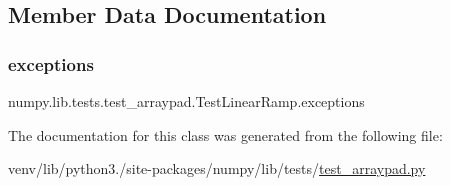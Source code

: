 \subsection{Member Data Documentation}
\mbox{\label{classnumpy_1_1lib_1_1tests_1_1test__arraypad_1_1TestLinearRamp_a6051ce71678e5f8a9587ab6c139c1cf2}} 
\subsubsection{\texorpdfstring{exceptions}{exceptions}}
{\footnotesize\ttfamily numpy.\+lib.\+tests.\+test\+\_\+arraypad.\+Test\+Linear\+Ramp.\+exceptions\hspace{0.3cm}{\ttfamily [static]}}



The documentation for this class was generated from the following file\+:\begin{DoxyCompactItemize}
\item 
venv/lib/python3./site-\/packages/numpy/lib/tests/\hyperlink{test__arraypad_8py}{test\+\_\+arraypad.\+py}\end{DoxyCompactItemize}
